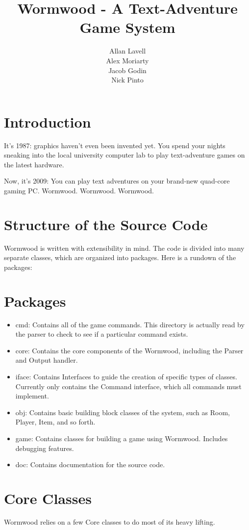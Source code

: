 \documentclass[12pt]{report}
\title{Wormwood - A Text-Adventure Game System}
\author{Allan Lavell \\ Alex Moriarty \\ Jacob Godin \\ Nick Pinto}
\begin{document}
\maketitle

\section{Introduction}
It's 1987: graphics haven't even been invented yet. You spend your nights sneaking into the local university computer lab to play text-adventure games on the latest hardware. 

Now, it's 2009: You can play text adventures on your brand-new quad-core gaming PC. 
Wormwood. Wormwood. Wormwood.

\section{Structure of the Source Code}
Wormwood is written with extensibility in mind. The code is divided into many separate 
classes, which are organized into packages. Here is a rundown of the packages:

\section{Packages}
\begin{itemize}
\item cmd: Contains all of the game commands. This directory is actually read by the parser to check to see if a particular command exists.
\item core: Contains the core components of the Wormwood, including the Parser and Output handler.
\item iface: Contains Interfaces to guide the creation of specific types of classes. Currently only contains the Command interface, which all commands must implement.
\item obj: Contains basic building block classes of the system, such as Room, Player, Item, and so forth.
\item game: Contains classes for building a game using Wormwood. Includes debugging features. 
\item doc: Contains documentation for the source code.
\end{itemize}

\section{Core Classes}
Wormwood relies on a few Core classes to do most of its heavy lifting. 
\end{document}
